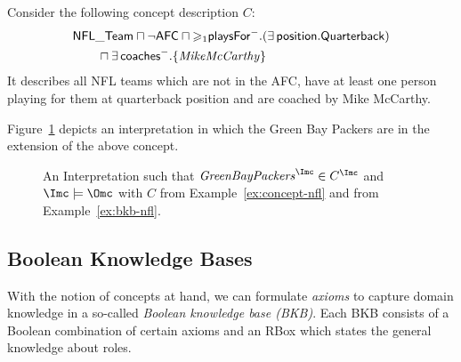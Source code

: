 \begin{example}\label{ex:concept-nfl}
  Consider the following concept description $C$:
  \begin{align*}
    & \mathsf{NFL\_{}Team} \sqcap \lnot \mathsf{AFC} \sqcap
    \atleast{1}{\mathsf{playsFor}^{-}}{(\exists\mathsf{position}.\mathsf{Quarterback})} \\
    & \qquad\sqcap \exists\mathsf{coaches}^{-}.\{\text{\textit{MikeMcCarthy}}\}
  \end{align*}
  It describes all NFL teams which are not in the AFC, have at least one person playing for them at
  quarterback position and are coached by Mike McCarthy.

  Figure~\ref{fig:example-concept} depicts an interpretation in which the Green Bay Packers are in the extension of the above concept.
\end{example}
\begin{figure}
  \centering
  \caption{An Interpretation \I such that $\text{\textit{GreenBayPackers}}^{\I} \in C^{\I}$ and
    $\I\models\Omc$ with $C$ from Example~\ref{ex:concept-nfl} and \Omc from Example~\ref{ex:bkb-nfl}.}
  \label{fig:example-concept}
\end{figure}



\subsection{Boolean Knowledge Bases}
\label{sec:dl-axioms}

With the notion of concepts at hand, we can formulate \emph{axioms} to capture domain knowledge in a
so-called \emph{Boolean knowledge base (BKB)}. Each BKB consists of a Boolean combination of certain
axioms and an RBox which states the general knowledge about roles.

